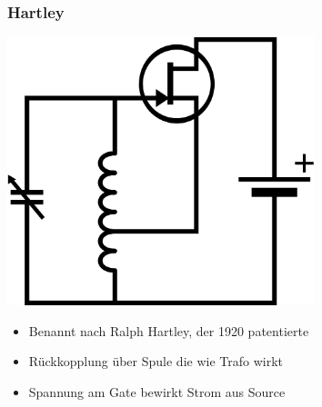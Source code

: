 \begin{frame}
  \frametitle{Hartley}
  \begin{center}
    \includegraphics[width=0.67\textwidth,height=.5\textheight,keepaspectratio]{a07/Hartley_osc.png}
    {\tiny \hyperlink{refs}{\cite{wm}}} \\[1em]
    \begin{itemize}
      \item Benannt nach Ralph Hartley, der 1920 patentierte
      \item Rückkopplung über Spule die wie Trafo wirkt
      \item Spannung am Gate bewirkt Strom aus Source 
    \end{itemize}
  \end{center}
\end{frame}

